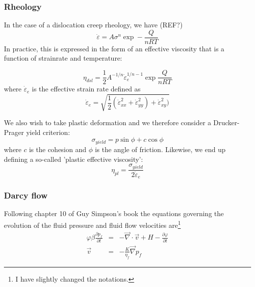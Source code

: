 \documentclass[a4paper]{article}
\begin{document}
\subsubsection{Rheology}

In the case of a dislocation creep rheology, we have (REF?)
\[
\dot\varepsilon = A \sigma^n \exp -\frac{Q }{nRT}
\]
In practice, this is expressed in the form of an effective
viscosity that is a function of strainrate and temperature:

\[
\eta_{dsl} = \frac{1}{2} A^{-1/n} \dot\varepsilon_e^{1/n-1} 
\exp \frac{Q }{nRT}
\]
where $\dot\varepsilon_e$ is the effective strain rate defined as 
\[
\dot\varepsilon_e = \sqrt{\frac12 (
\dot\varepsilon_{xx}^2+
\dot\varepsilon_{yy}^2)+
\dot\varepsilon_{xy}^2
)} 
\]

We also wish to take plastic deformation
and we therefore consider a Drucker-Prager yield criterion:
\[
\sigma_{yield} = p \sin\phi + c \cos \phi
\]
where $c$ is the cohesion and $\phi$ is the angle of friction.
Likewise, we end up defining a so-called 'plastic effective viscosity':
\[
\eta_{pl} = \frac{\sigma_{yield}}{2 \dot\varepsilon_e }
\]

\subsubsection{Darcy flow}

Following chapter 10 of Guy Simpson's book \textcite{simp17} 
the equations governing the evolution of the fluid pressure and 
fluid flow velocities are\footnote{I have slightly 
changed the notations.}
\begin{eqnarray}
\varphi \beta \frac{\partial p_f}{\partial t} &=& -\vec\nabla \cdot \vec{v} + H -\frac{\partial \varphi}{\partial t}\label{eq:128:a}\\
\vec{v} &=& -\frac{K}{\eta_f} \vec\nabla p_f \label{eq:128:b}
\end{eqnarray}
\end{document}
